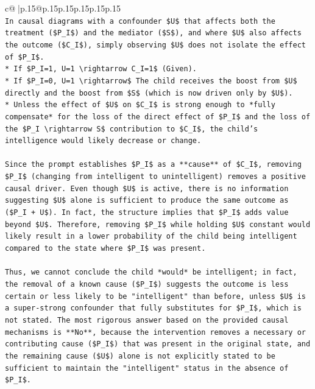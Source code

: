 \documentclass{article}
\begin{document}
{\begin{supertabular}{c@{$\;$}|p{.15\linewidth}@{}p{.15\linewidth}p{.15\linewidth}p{.15\linewidth}p{.15\linewidth}p{.15\linewidth}}
{{{\\ 
\texttt{In causal diagrams with a confounder \$U\$ that affects both the treatment (\$P\_I\$) and the mediator (\$S\$), and where \$U\$ also affects the outcome (\$C\_I\$), simply observing \$U\$ does not isolate the effect of \$P\_I\$.} \\
\texttt{*   If \$P\_I=1, U=1 \textbackslash{}rightarrow C\_I=1\$ (Given).} \\
\texttt{*   If \$P\_I=0, U=1 \textbackslash{}rightarrow\$ The child receives the boost from \$U\$ directly and the boost from \$S\$ (which is now driven only by \$U\$).} \\
\texttt{*   Unless the effect of \$U\$ on \$C\_I\$ is strong enough to *fully compensate* for the loss of the direct effect of \$P\_I\$ and the loss of the \$P\_I \textbackslash{}rightarrow S\$ contribution to \$C\_I\$, the child's intelligence would likely decrease or change.} \\
\\ 
\texttt{Since the prompt establishes \$P\_I\$ as a **cause** of \$C\_I\$, removing \$P\_I\$ (changing from intelligent to unintelligent) removes a positive causal driver. Even though \$U\$ is active, there is no information suggesting \$U\$ alone is sufficient to produce the same outcome as (\$P\_I + U\$). In fact, the structure implies that \$P\_I\$ adds value beyond \$U\$. Therefore, removing \$P\_I\$ while holding \$U\$ constant would likely result in a lower probability of the child being intelligent compared to the state where \$P\_I\$ was present.} \\
\\ 
\texttt{Thus, we cannot conclude the child *would* be intelligent; in fact, the removal of a known cause (\$P\_I\$) suggests the outcome is less certain or less likely to be "intelligent" than before, unless \$U\$ is a super{-}strong confounder that fully substitutes for \$P\_I\$, which is not stated. The most rigorous answer based on the provided causal mechanisms is **No**, because the intervention removes a necessary or contributing cause (\$P\_I\$) that was present in the original state, and the remaining cause (\$U\$) alone is not explicitly stated to be sufficient to maintain the "intelligent" status in the absence of \$P\_I\$.} \\
\\ 
}}}
\end{supertabular}}
\end{document}
